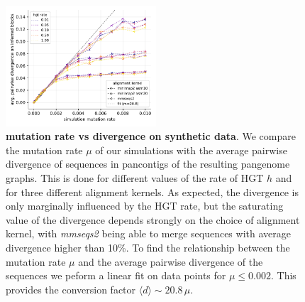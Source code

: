 \documentclass[aps,rmp,reprint,superscriptaddress,notitlepage,10pt,onecolumn]{revtex4-1}
\newcommand{\avg}[1]{\langle #1 \rangle}
\begin{document}
\begin{figure}[h]
    \includegraphics[width=0.5\textwidth]{figs_suppl/snps_rate_vs_divergence.pdf}
    \caption{{\bf mutation rate vs divergence on synthetic data}. We compare the mutation rate $\mu$ of our simulations with the average pairwise divergence of sequences in pancontigs of the resulting pangenome graphs. This is done for different values of the rate of HGT $h$ and for three different alignment kernels. As expected, the divergence is only marginally influenced by the HGT rate, but the saturating value of the divergence depends strongly on the choice of alignment kernel, with \textit{mmseqs2} being able to merge sequences with average divergence higher than 10\%. To find the relationship between the mutation rate $\mu$ and the average pairwise divergence of the sequences we peform a linear fit on data points for $\mu \leq 0.002$. This provides the conversion factor $\avg{d} \sim 20.8 \, \mu$.}
    \label{fig:snps-suppl}
\end{figure}
\end{document}
